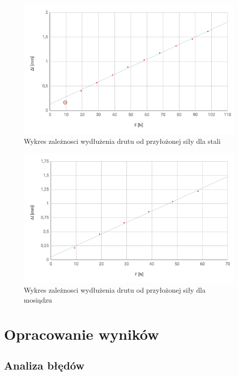 \documentclass[a4paper,10pt,twoside]{article}
\begin{document}
\begin{figure}[!htp]
\centerline{\includegraphics[scale=0.65]{steel_wire_first_point_marked.png}}
\caption{Wykres zależnosci wydłużenia drutu od przyłożonej siły dla stali}
\label{fig:tl}
\end{figure}

\begin{figure}[!htp]
\centerline{\includegraphics[scale=0.65]{brass_wire.png}}
\caption{Wykres zależnosci wydłużenia drutu od przyłożonej siły dla mosiądzu}
\label{fig:tl}
\end{figure}

\section{Opracowanie wyników}

\subsection{Analiza błędów}
\end{document}
